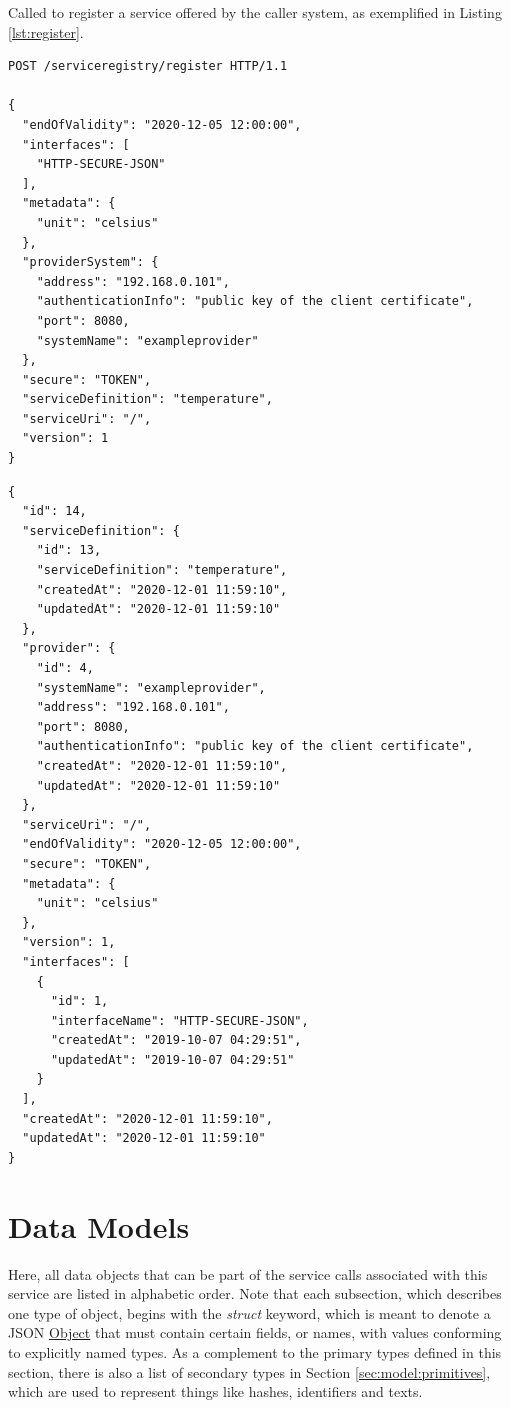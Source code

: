 \documentclass[a4paper]{arrowhead}
\newcommand{\fref}[1]{{\textcolor{ArrowheadBlue}{\hyperref[sec:functions:#1]{#1}}}}
\newcommand{\pref}[1]{{\textcolor{ArrowheadGrey}{\hyperref[sec:model:primitives:#1]{#1}}}}
\begin{document}

Called to register a service offered by the caller system, as exemplified in Listing \ref{lst:register}.

\begin{lstlisting}[language=http,label={lst:register},caption={A \fref{Register} invocation.}]
POST /serviceregistry/register HTTP/1.1

{
  "endOfValidity": "2020-12-05 12:00:00",
  "interfaces": [
    "HTTP-SECURE-JSON"
  ],
  "metadata": {
    "unit": "celsius"
  },
  "providerSystem": {
    "address": "192.168.0.101",
    "authenticationInfo": "public key of the client certificate",
    "port": 8080,
    "systemName": "exampleprovider"
  },
  "secure": "TOKEN",
  "serviceDefinition": "temperature",
  "serviceUri": "/",
  "version": 1
}
\end{lstlisting}

\begin{lstlisting}[language=http,label={lst:register_response},caption={A \fref{Register} response. Every \pref{Object} contains an id.}]
{
  "id": 14,
  "serviceDefinition": {
    "id": 13,
    "serviceDefinition": "temperature",
    "createdAt": "2020-12-01 11:59:10",
    "updatedAt": "2020-12-01 11:59:10"
  },
  "provider": {
    "id": 4,
    "systemName": "exampleprovider",
    "address": "192.168.0.101",
    "port": 8080,
    "authenticationInfo": "public key of the client certificate",
    "createdAt": "2020-12-01 11:59:10",
    "updatedAt": "2020-12-01 11:59:10"
  },
  "serviceUri": "/",
  "endOfValidity": "2020-12-05 12:00:00",
  "secure": "TOKEN",
  "metadata": {
    "unit": "celsius"
  },
  "version": 1,
  "interfaces": [
    {
      "id": 1,
      "interfaceName": "HTTP-SECURE-JSON",
      "createdAt": "2019-10-07 04:29:51",
      "updatedAt": "2019-10-07 04:29:51"
    }
  ],
  "createdAt": "2020-12-01 11:59:10",
  "updatedAt": "2020-12-01 11:59:10"
}
\end{lstlisting}
\newpage

\section{Data Models}
\label{sec:model}

Here, all data objects that can be part of the service calls associated with this service are listed in alphabetic order.
Note that each subsection, which describes one type of object, begins with the \textit{struct} keyword, which is meant to denote a JSON \pref{Object} that must contain certain fields, or names, with values conforming to explicitly named types.
As a complement to the primary types defined in this section, there is also a list of secondary types in Section \ref{sec:model:primitives}, which are used to represent things like hashes, identifiers and texts.
\end{document}
